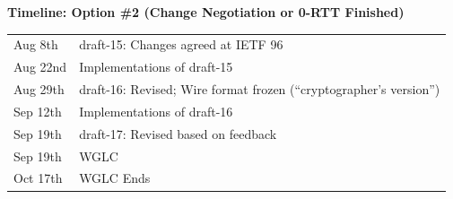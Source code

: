 \documentclass[helvetica]{seminar}
\newcommand{\heading}[1]{%
  \begin{center} 
    \large\bf 
    #1 
  \end{center} 
  \vspace{.4 in}}
\begin{document}
\begin{slide}
\heading{Timeline: Option \#2 (Change Negotiation or 0-RTT Finished)}

\begin{tabular}{l l}
Aug 8th & draft-15: Changes agreed at IETF 96 \\
Aug 22nd & Implementations of draft-15 \\
Aug 29th & draft-16: Revised; Wire format frozen (``cryptographer's version'')\\
Sep 12th & Implementations of draft-16 \\
Sep 19th & draft-17: Revised based on feedback \\
Sep 19th & WGLC \\
Oct 17th & WGLC Ends \\
\end{tabular}

\end{slide}
\end{document}
